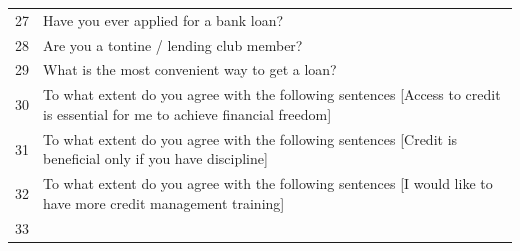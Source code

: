 \begin{longtable}[]{@{}ll@{}}
\begin{minipage}[t]{0.05\columnwidth}\raggedright
27\strut
\end{minipage} & \begin{minipage}[t]{0.89\columnwidth}\raggedright
Have you ever applied for a bank loan?\strut
\end{minipage}\tabularnewline
\begin{minipage}[t]{0.05\columnwidth}\raggedright
28\strut
\end{minipage} & \begin{minipage}[t]{0.89\columnwidth}\raggedright
Are you a tontine / lending club member?\strut
\end{minipage}\tabularnewline
\begin{minipage}[t]{0.05\columnwidth}\raggedright
29\strut
\end{minipage} & \begin{minipage}[t]{0.89\columnwidth}\raggedright
What is the most convenient way to get a loan?\strut
\end{minipage}\tabularnewline
\begin{minipage}[t]{0.05\columnwidth}\raggedright
30\strut
\end{minipage} & \begin{minipage}[t]{0.89\columnwidth}\raggedright
To what extent do you agree with the following sentences {[}Access to
credit is essential for me to achieve financial freedom{]}\strut
\end{minipage}\tabularnewline
\begin{minipage}[t]{0.05\columnwidth}\raggedright
31\strut
\end{minipage} & \begin{minipage}[t]{0.89\columnwidth}\raggedright
To what extent do you agree with the following sentences {[}Credit is
beneficial only if you have discipline{]}\strut
\end{minipage}\tabularnewline
\begin{minipage}[t]{0.05\columnwidth}\raggedright
32\strut
\end{minipage} & \begin{minipage}[t]{0.89\columnwidth}\raggedright
To what extent do you agree with the following sentences {[}I would like
to have more credit management training{]}\strut
\end{minipage}\tabularnewline
\begin{minipage}[t]{0.05\columnwidth}\raggedright
33\strut
\end{minipage} & \begin{minipage}[t]{0.89\columnwidth}\raggedright

\end{minipage}
\end{longtable}
